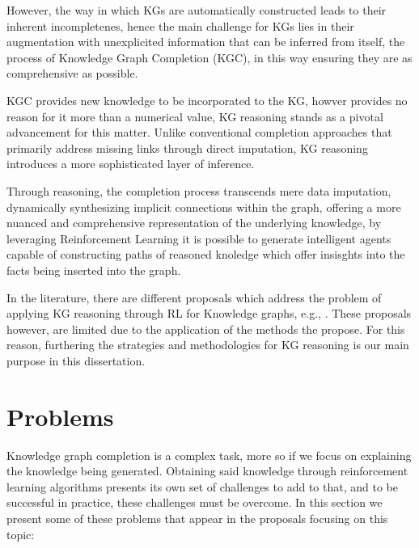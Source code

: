 However, the way in which KGs are automatically constructed leads to their inherent incompletenes, hence the main challenge for KGs lies in their augmentation with unexplicited information that can be inferred from itself, the process of Knowledge Graph Completion (KGC), in this way ensuring they are as comprehensive as possible.

KGC provides new knowledge to be incorporated to the KG, howver provides no reason for it more than a numerical value, KG reasoning stands as a pivotal advancement for this matter. Unlike conventional completion approaches that primarily address missing links through direct imputation, KG reasoning introduces a more sophisticated layer of inference.

Through reasoning, the completion process transcends mere data imputation, dynamically synthesizing implicit connections within the graph, offering a more nuanced and comprehensive representation of the underlying knowledge, by leveraging Reinforcement Learning it is possible to generate intelligent agents capable of constructing paths of reasoned knoledge which offer insisghts into the facts being inserted into the graph.

In the literature, there are different proposals which address the problem of
applying KG reasoning through RL for Knowledge graphs, e.g., \cite{}. These proposals however, are limited due to the application of the methods the propose. For this reason, furthering the strategies and methodologies for KG reasoning is our main purpose in this dissertation.

\section{Problems}\label{sec:moti-problems}
Knowledge graph completion is a complex task, more so if we focus on explaining the knowledge being generated. Obtaining said knowledge through reinforcement learning algorithms presents its own set of challenges to add to that, and to be successful in practice, these challenges must be overcome. In this section we present some of these problems that appear in the proposals focusing on this topic:

